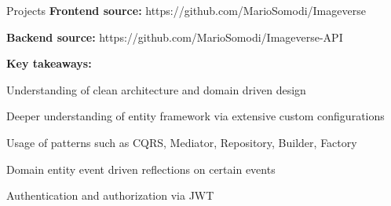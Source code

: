 \begin{rubric}{Projects}
	\textbf{Frontend source: }https://github.com/MarioSomodi/Imageverse \par
	\textbf{Backend source: }https://github.com/MarioSomodi/Imageverse-API\par
	\textbf{Key takeaways: }\par
	\begin{list}{}{\leftmargin=0pt \itemindent=1em}
		\item Understanding of clean architecture and domain driven design
		\item Deeper understanding of entity framework via extensive custom configurations
		\item Usage of patterns such as CQRS, Mediator, Repository, Builder, Factory
		\item Domain entity event driven reflections on certain events
		\item Authentication and authorization via JWT
	\end{list}
\end{rubric}